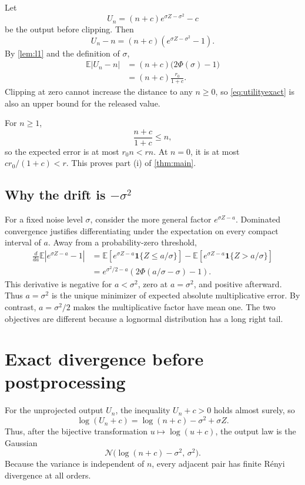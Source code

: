 \documentclass[11pt]{article}
\newcommand{\N}{\mathcal{N}}
\newcommand{\E}{\mathbb{E}}
\theoremstyle{definition}
\begin{document}
Let
\[
  U_n=(n+c)e^{\sigma Z-\sigma^2}-c
\]
be the output before clipping. Then
\[
  U_n-n=(n+c)\left(e^{\sigma Z-\sigma^2}-1\right).
\]
By \cref{lem:l1} and the definition of $\sigma$,
\begin{align}
  \E|U_n-n|
  &=(n+c)\bigl(2\Phi(\sigma)-1\bigr)
\nonumber\\
  &=(n+c)\frac{r_0}{1+c}.
  \label{eq:utilityexact}
\end{align}
Clipping at zero cannot increase the distance to any $n\ge 0$, so \eqref{eq:utilityexact} is also an upper bound for the released value.

For $n\ge 1$,
\[
  \frac{n+c}{1+c}\le n,
\]
so the expected error is at most $r_0n<rn$. At $n=0$, it is at most $cr_0/(1+c)<r$. This proves part (i) of \cref{thm:main}.

\subsection{Why the drift is \texorpdfstring{$-\sigma^2$}{-sigma squared}}

For a fixed noise level $\sigma$, consider the more general factor $e^{\sigma Z-a}$. Dominated convergence justifies differentiating under the expectation on every compact interval of $a$. Away from a probability-zero threshold,
\begin{align*}
  \frac{d}{da}\E|e^{\sigma Z-a}-1|
  &=\E\!\left[e^{\sigma Z-a}\mathbf{1}\{Z\le a/\sigma\}\right]
    -\E\!\left[e^{\sigma Z-a}\mathbf{1}\{Z>a/\sigma\}\right]\\
  &=e^{\sigma^2/2-a}
    \left(2\Phi(a/\sigma-\sigma)-1\right).
\end{align*}
This derivative is negative for $a<\sigma^2$, zero at $a=\sigma^2$, and positive afterward. Thus $a=\sigma^2$ is the unique minimizer of expected absolute multiplicative error. By contrast, $a=\sigma^2/2$ makes the multiplicative factor have mean one. The two objectives are different because a lognormal distribution has a long right tail.

\section{Exact divergence before postprocessing}
\label{sec:privacy}

For the unprojected output $U_n$, the inequality $U_n+c>0$ holds almost surely, so
\begin{equation}
  \log(U_n+c)
  =\log(n+c)-\sigma^2+\sigma Z.
  \label{eq:lognormal}
\end{equation}
Thus, after the bijective transformation $u\mapsto\log(u+c)$, the output law is the Gaussian
\[
  \N\bigl(\log(n+c)-\sigma^2,\,\sigma^2\bigr).
\]
Because the variance is independent of $n$, every adjacent pair has finite R\'enyi divergence at all orders.
\end{document}
